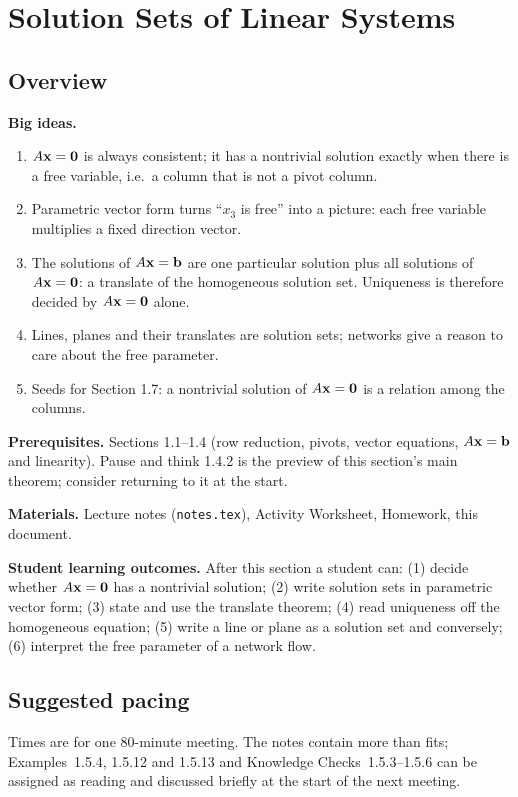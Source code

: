 \documentclass[11pt]{article}
\begin{document}
\section{Solution Sets of Linear Systems}

\subsection*{Overview}
\textbf{Big ideas.}
\begin{enumerate}[nosep]
  \item $A\mathbf{x}=\mathbf{0}$ is always consistent; it has a nontrivial solution exactly when there is a free variable, i.e.\ a column that is not a pivot column.
  \item Parametric vector form turns ``$x_3$ is free'' into a picture: each free variable multiplies a fixed direction vector.
  \item The solutions of $A\mathbf{x}=\mathbf{b}$ are one particular solution plus all solutions of $A\mathbf{x}=\mathbf{0}$: a translate of the homogeneous solution set. Uniqueness is therefore decided by $A\mathbf{x}=\mathbf{0}$ alone.
  \item Lines, planes and their translates are solution sets; networks give a reason to care about the free parameter.
  \item Seeds for Section 1.7: a nontrivial solution of $A\mathbf{x}=\mathbf{0}$ is a relation among the columns.
\end{enumerate}
\textbf{Prerequisites.} Sections 1.1--1.4 (row reduction, pivots, vector equations, $A\mathbf{x}=\mathbf{b}$ and linearity). Pause and think 1.4.2 is the preview of this section's main theorem; consider returning to it at the start.

\textbf{Materials.} Lecture notes (\texttt{notes.tex}), Activity Worksheet, Homework, this document.

\textbf{Student learning outcomes.} After this section a student can: (1) decide whether $A\mathbf{x}=\mathbf{0}$ has a nontrivial solution; (2) write solution sets in parametric vector form; (3) state and use the translate theorem; (4) read uniqueness off the homogeneous equation; (5) write a line or plane as a solution set and conversely; (6) interpret the free parameter of a network flow.

\subsection*{Suggested pacing}
Times are for one 80-minute meeting. The notes contain more than fits; Examples~1.5.4, 1.5.12 and 1.5.13 and Knowledge Checks~1.5.3--1.5.6 can be assigned as reading and discussed briefly at the start of the next meeting.
\end{document}
